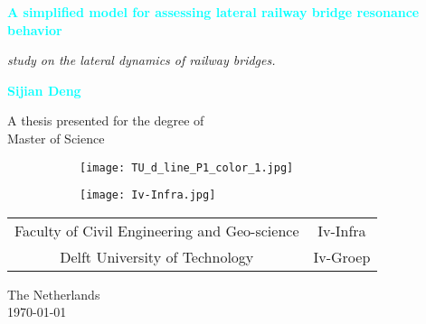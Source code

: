 
\begin{titlepage}
    \begin{center}
        \vspace*{1cm}
        
        \Large{\textbf{\textcolor{cyan}{A simplified model for assessing  lateral railway bridge resonance behavior}}}
        

        \normalsize

        \vspace{0.5cm}
        \textit{study on the lateral dynamics of railway bridges.}
        


        \vspace{1.5cm}
        
        \textbf{\textcolor{cyan}{Sijian Deng}}
        
        \vfill
        
        A thesis presented for the degree of\\
        Master of Science
        
        \vspace{0.8cm}
        
        \begin{figure}[h]
        \centering
        \begin{subfigure}[b]{0.3\textwidth}
                \texttt{[image: TU\_d\_line\_P1\_color\_1.jpg]}
        \end{subfigure}
        \begin{subfigure}[b]{0.3\textwidth}
                \texttt{[image: Iv-Infra.jpg]}
        \end{subfigure}
        \end{figure}

        \begin{tabular} {cc}
        Faculty of Civil Engineering and Geo-science & Iv-Infra \\
        Delft University of Technology & Iv-Groep\\

        \end{tabular}

        The Netherlands \\
        \today
        
    \end{center}
\end{titlepage}